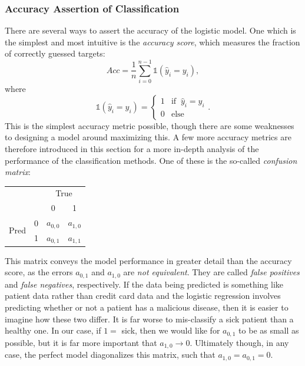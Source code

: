         \subsubsection{Accuracy Assertion of Classification}
            There are several ways to assert the accuracy of the logistic model. One which is the simplest and most intuitive is the \textit{accuracy score}, which measures the fraction of correctly guessed targets:
            \begin{equation}
                Acc = \frac1n\sum^{n-1}_{i=0} \mathds{1}(\hat{y}_i=y_i),
            \end{equation}
            where 
            \begin{equation}
                \mathds{1}(\hat{y}_i=y_i) = \begin{cases}1 & \text{if  }\ \hat{y}_i=y_i \\ 0 & \text{else}\end{cases}.
            \end{equation}
            This is the simplest accuracy metric possible, though there are some weaknesses to designing a model around maximizing this. A few more accuracy metrics are therefore introduced in this section for a more in-depth analysis of the performance of the classification methods. One of these is the so-called \textit{confusion matrix}:
            \begin{table}[H]
                \centering                                                                                           
                \begin{tabular}{cc|cc}
                     & & \multicolumn{2}{c}{True}\\
                     & & 0 & 1\\\hline
                    \multirow{ 2}{*}{Pred} & 0 & $a_{0,0}$ & $a_{1,0}$ \\
                     & 1 & $a_{0,1}$ & $a_{1,1}$
                \end{tabular}
            \end{table}
            This matrix conveys the model performance in greater detail than the accuracy score, as the errors $a_{0,1}$ and $a_{1,0}$ are \textit{not equivalent}. They are called \textit{false positives} and \textit{false negatives}, respectively. If the data being predicted is something like patient data rather than credit card data and the logistic regression involves predicting whether or not a patient has a malicious disease, then it is easier to imagine how these two differ. It is far worse to mis-classify a sick patient than a healthy one. In our case, if $1=$ sick, then we would like for $a_{0,1}$ to be as small as possible, but it is far more important that $a_{1,0}\rightarrow 0$. Ultimately though, in any case, the perfect model diagonalizes this matrix, such that $a_{1,0}=a_{0,1}=0$. \\\\
